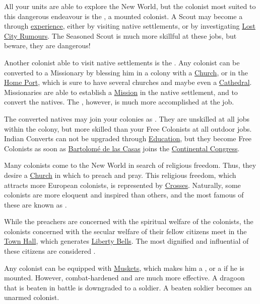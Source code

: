 \documentclass[12pt]{article}
\begin{document}
All your units are able to explore the New World, but the colonist
most suited to this dangerous endeavour is the , a mounted
colonist. A Scout may become a  through
\hyperlink{Skills and Education}{experience}, either by visiting
native settlements, or by investigating \hyperlink{Lost City
Rumours}{Lost City Rumours}. The Seasoned Scout is much more skillful
at these jobs, but beware, they are dangerous!

Another colonist able to visit native settlements is the
. Any colonist can be converted to a Missionary by
blessing him in a colony with a \hyperlink{Church}{Church}, or in the
\hyperlink{Home Port}{Home Port}, which is sure to have several
churches and maybe even a
\hyperlink{Cathedral}{Cathedral}. Missionaries are able to establish a
\hyperlink{Mission}{Mission} in the native settlement, and to convert
the natives. The , however, is much more
accomplished at the job.

The converted natives may join your colonies as . They are unskilled at all jobs within the colony, but more
skilled than your Free Colonists at all outdoor jobs. Indian Converts
can not be upgraded through \hyperlink{Skills and
Education}{Education}, but they become Free Colonists as soon as
\hyperlink{Bartolome de las Casas}{Bartolom{\'e} de las Casas} joins
the \hyperlink{Continental Congress}{Continental Congress}.

Many colonists come to the New World in search of religious
freedom. Thus, they desire a \hyperlink{Church}{Church} in which to
preach and pray. This religious freedom, which attracts more European
colonists, is represented by \hyperlink{Crosses}{Crosses}. Naturally,
some colonists are more eloquent and inspired than others, and the
most famous of these are known as .

While the preachers are concerned with the spiritual welfare of the
colonists, the colonists concerned with the secular welfare of their
fellow citizens meet in the \hyperlink{Town Hall}{Town Hall}, which
generates \hyperlink{Liberty Bells}{Liberty Bells}. The most dignified
and influential of these citizens are considered .

Any colonist can be equipped with \hyperlink{Muskets}{Muskets}, which
makes him a , or a  if he is
mounted. However, combat-hardened  and
 are much more effective. A dragoon that is
beaten in battle is downgraded to a soldier. A beaten soldier becomes
an unarmed colonist.
\end{document}
